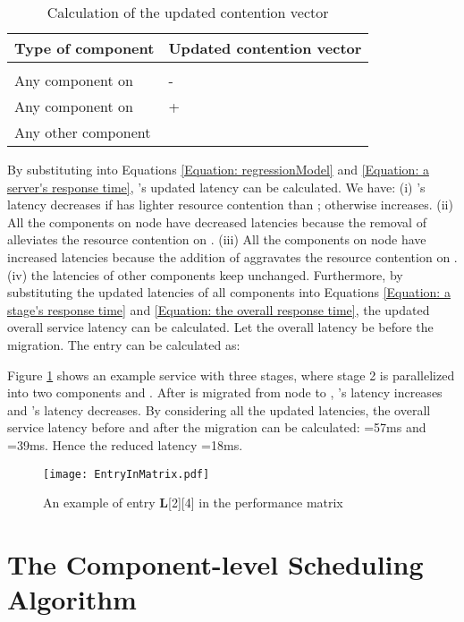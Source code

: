 \documentclass[10pt, conference, compsocconf]{IEEEtran}
\begin{document}
\begin{table}[h!]
  \caption{Calculation of the updated contention vector }
  \centering
  \begin{tabular}{|l|l|}
    \hline
    \textbf{Type of component } & \textbf{Updated contention vector } \\
    \hline
    & \\
    \hline
    Any component on  & -\\
    \hline
    Any component on  & +\\
    \hline
    Any other component & \\
    \hline
  \end{tabular}
  \label{table: Updated usage vectors in migration}
\end{table}

By substituting  into Equations \ref{Equation: regressionModel} and \ref{Equation: a server's response time}, 's updated latency  can be calculated. We have: (i) 's latency  decreases if  has lighter resource contention than ; otherwise  increases. (ii) All the components on node  have decreased latencies because the removal of  alleviates the resource contention on . (iii) All the components on node  have increased latencies because the addition of  aggravates the resource contention on . (iv) the latencies of other components keep unchanged. Furthermore, by substituting the updated latencies of all  components into Equations \ref{Equation: a stage's response time} and \ref{Equation: the overall response time}, the updated overall service latency  can be calculated. Let the overall latency be  before the migration. The entry  can be calculated as:




Figure \ref{Fig: EntryInMatrix} shows an example service with three stages, where stage 2 is parallelized into two components  and . After  is migrated from node  to , 's latency  increases and 's latency  decreases. By considering all the updated latencies, the overall service latency before and after the migration can be calculated: =57ms and =39ms. Hence the reduced latency =18ms.

\begin{figure}
\centering
  \texttt{[image: EntryInMatrix.pdf]}\\
  \caption{An example of entry \textbf{L}[2][4] in the performance matrix}
  \label{Fig: EntryInMatrix}
\end{figure}



\section{The Component-level Scheduling Algorithm} \label{Section: Algorithm}
\end{document}

